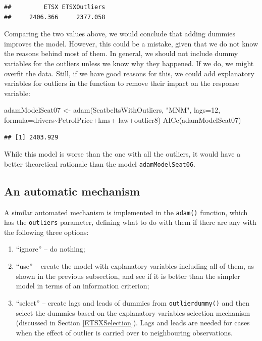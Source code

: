 \documentclass[
]{book}
\newenvironment{Shaded}{\begin{snugshade}}{\end{snugshade}}
\newcommand{\AttributeTok}[1]{\textcolor[rgb]{0.77,0.63,0.00}{#1}}
\newcommand{\DecValTok}[1]{\textcolor[rgb]{0.00,0.00,0.81}{#1}}
\newcommand{\FunctionTok}[1]{\textcolor[rgb]{0.00,0.00,0.00}{#1}}
\newcommand{\NormalTok}[1]{#1}
\newcommand{\OtherTok}[1]{\textcolor[rgb]{0.56,0.35,0.01}{#1}}
\newcommand{\SpecialCharTok}[1]{\textcolor[rgb]{0.00,0.00,0.00}{#1}}
\newcommand{\StringTok}[1]{\textcolor[rgb]{0.31,0.60,0.02}{#1}}
\providecommand{\tightlist}{%
  \setlength{\itemsep}{0pt}\setlength{\parskip}{0pt}}
\theoremstyle{definition}
\theoremstyle{definition}
\theoremstyle{definition}
\theoremstyle{definition}
\theoremstyle{remark}
\begin{document}
\begin{verbatim}
##         ETSX ETSXOutliers 
##     2406.366     2377.058
\end{verbatim}

Comparing the two values above, we would conclude that adding dummies improves the model. However, this could be a mistake, given that we do not know the reasons behind most of them. In general, we should not include dummy variables for the outliers unless we know why they happened. If we do, we might overfit the data. Still, if we have good reasons for this, we could add explanatory variables for outliers in the function to remove their impact on the response variable:

\begin{Shaded}
\begin{Highlighting}[]
\NormalTok{adamModelSeat07 }\OtherTok{\textless{}{-}} \FunctionTok{adam}\NormalTok{(SeatbeltsWithOutliers, }\StringTok{"MNM"}\NormalTok{, }\AttributeTok{lags=}\DecValTok{12}\NormalTok{,}
                        \AttributeTok{formula=}\NormalTok{drivers}\SpecialCharTok{\textasciitilde{}}\NormalTok{PetrolPrice}\SpecialCharTok{+}\NormalTok{kms}\SpecialCharTok{+}
\NormalTok{                          law}\SpecialCharTok{+}\NormalTok{outlier8)}
\FunctionTok{AICc}\NormalTok{(adamModelSeat07)}
\end{Highlighting}
\end{Shaded}

\begin{verbatim}
## [1] 2403.929
\end{verbatim}

While this model is worse than the one with all the outliers, it would have a better theoretical rationale than the model \texttt{adamModelSeat06}.

\hypertarget{an-automatic-mechanism}{%
\subsection{An automatic mechanism}\label{an-automatic-mechanism}}

A similar automated mechanism is implemented in the \texttt{adam()} function, which has the \texttt{outliers} parameter, defining what to do with them if there are any with the following three options:

\begin{enumerate}
\def\labelenumi{\arabic{enumi}.}
\tightlist
\item
  ``ignore'' -- do nothing;
\item
  ``use'' -- create the model with explanatory variables including all of them, as shown in the previous subsection, and see if it is better than the simpler model in terms of an information criterion;
\item
  ``select'' -- create lags and leads of dummies from \texttt{outlierdummy()} and then select the dummies based on the explanatory variables selection mechanism (discussed in Section \ref{ETSXSelection}). Lags and leads are needed for cases when the effect of outlier is carried over to neighbouring observations.
\end{enumerate}
\end{document}
